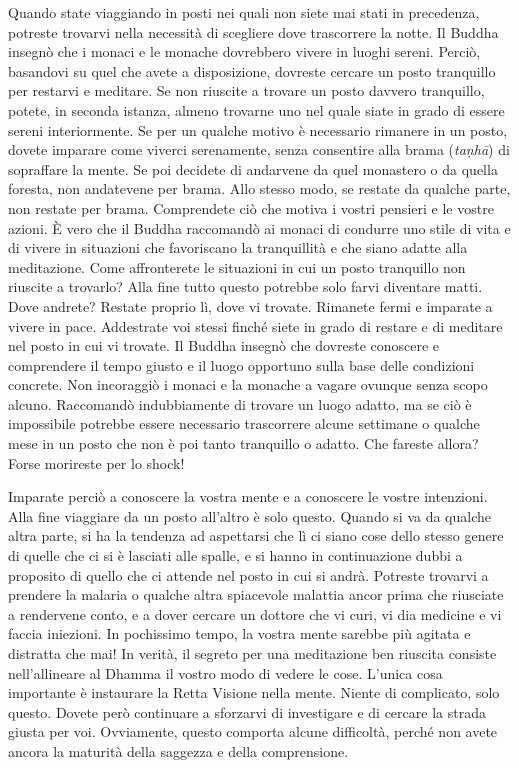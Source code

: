 Quando state viaggiando in posti nei quali non siete mai stati in
precedenza, potreste trovarvi nella necessità di scegliere dove
trascorrere la notte. Il Buddha insegnò che i monaci e le monache
dovrebbero vivere in luoghi sereni. Perciò, basandovi su quel che avete
a disposizione, dovreste cercare un posto tranquillo per restarvi e
meditare. Se non riuscite a trovare un posto davvero tranquillo, potete,
in seconda istanza, almeno trovarne uno nel quale siate in grado di
essere sereni interiormente. Se per un qualche motivo è necessario
rimanere in un posto, dovete imparare come viverci serenamente, senza
consentire alla brama (\emph{taṇhā}) di sopraffare la mente. Se poi
decidete di andarvene da quel monastero o da quella foresta, non
andatevene per brama. Allo stesso modo, se restate da qualche parte, non
restate per brama. Comprendete ciò che motiva i vostri pensieri e le
vostre azioni. È vero che il Buddha raccomandò ai monaci di condurre uno
stile di vita e di vivere in situazioni che favoriscano la tranquillità
e che siano adatte alla meditazione. Come affronterete le situazioni in
cui un posto tranquillo non riuscite a trovarlo? Alla fine tutto questo
potrebbe solo farvi diventare matti. Dove andrete? Restate proprio lì,
dove vi trovate. Rimanete fermi e imparate a vivere in pace. Addestrate
voi stessi finché siete in grado di restare e di meditare nel posto in
cui vi trovate. Il Buddha insegnò che dovreste conoscere e comprendere
il tempo giusto e il luogo opportuno sulla base delle condizioni
concrete. Non incoraggiò i monaci e la monache a vagare ovunque senza
scopo alcuno. Raccomandò indubbiamente di trovare un luogo adatto, ma se
ciò è impossibile potrebbe essere necessario trascorrere alcune
settimane o qualche mese in un posto che non è poi tanto tranquillo o
adatto. Che fareste allora? Forse morireste per lo shock!

Imparate perciò a conoscere la vostra mente e a conoscere le vostre
intenzioni. Alla fine viaggiare da un posto all'altro è solo questo.
Quando si va da qualche altra parte, si ha la tendenza ad aspettarsi che
lì ci siano cose dello stesso genere di quelle che ci si è lasciati alle
spalle, e si hanno in continuazione dubbi a proposito di quello che ci
attende nel posto in cui si andrà. Potreste trovarvi a prendere la
malaria o qualche altra spiacevole malattia ancor prima che riusciate a
rendervene conto, e a dover cercare un dottore che vi curi, vi dia
medicine e vi faccia iniezioni. In pochissimo tempo, la vostra mente
sarebbe più agitata e distratta che mai! In verità, il segreto per una
meditazione ben riuscita consiste nell'allineare al Dhamma il vostro
modo di vedere le cose. L'unica cosa importante è instaurare la Retta
Visione nella mente. Niente di complicato, solo questo. Dovete però
continuare a sforzarvi di investigare e di cercare la strada giusta per
voi. Ovviamente, questo comporta alcune difficoltà, perché non avete
ancora la maturità della saggezza e della comprensione.

